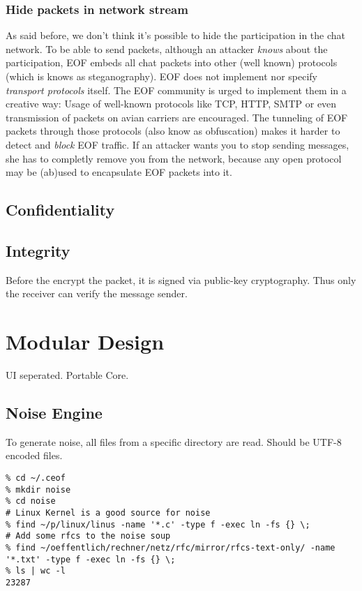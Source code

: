 \subsubsection{Hide packets in network stream}
As said before, we don't think it's possible to hide the participation in the
chat network. To be able to send packets, although an attacker \emph{knows}
about the participation, EOF embeds all chat packets into other (well known)
protocols (which is knows as steganography\cite{stegano-1}).
EOF does not implement nor specify \emph{transport protocols} itself.
The EOF community is urged to implement them in a creative way: Usage
of well-known protocols like TCP\cite{tcp-1}, HTTP\cite{http-1},
SMTP\cite{smtp-1} or even transmission of packets on avian
carriers\cite{avian-1} are encouraged. The tunneling of EOF packets through
those protocols (also know as obfuscation) makes it harder to detect
and \emph{block} EOF traffic. 
If an attacker wants you to stop sending messages, she has to completly
remove you from the network, because any open protocol may be (ab)used to
encapsulate EOF packets into it.




\subsection{Confidentiality}

\subsection{Integrity}
Before the encrypt the packet, it is signed via public-key
cryptography\cite{pgp-1}. Thus only the receiver can verify the message sender.


\section{Modular Design}
UI seperated.
Portable Core.
\subsection{Noise Engine}
To generate noise, all files from a specific directory are read.
Should be UTF-8 encoded files.

\begin{verbatim}
% cd ~/.ceof 
% mkdir noise
% cd noise 
# Linux Kernel is a good source for noise
% find ~/p/linux/linus -name '*.c' -type f -exec ln -fs {} \;
# Add some rfcs to the noise soup
% find ~/oeffentlich/rechner/netz/rfc/mirror/rfcs-text-only/ -name '*.txt' -type f -exec ln -fs {} \;
% ls | wc -l
23287
\end{verbatim}

